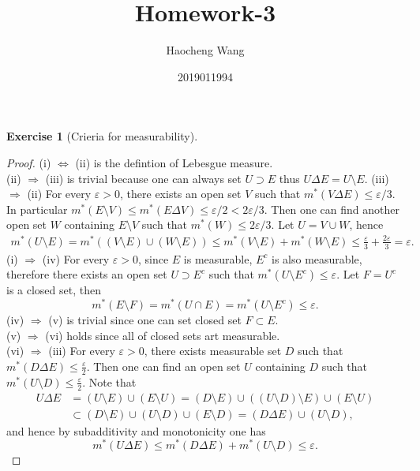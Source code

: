 \documentclass[a4paper]{article}
\title{Homework-3}
\author{Haocheng Wang \and 2019011994}
\newtheorem{ex}{Exercise}[subsection]
\begin{document}
\maketitle
\setcounter{subsection}{2}
\setcounter{ex}{6}

\begin{ex}[Crieria for measurability]\end{ex}
\begin{proof}
(i) $\iff$ (ii) is the defintion of Lebesgue measure.\\
(ii) $\Rightarrow$ (iii) is trivial because one can always set $U \supset E$ thus $U \Delta E = U \setminus E$.
(iii) $\Rightarrow$ (ii) For every $\varepsilon > 0$, there exists an open set $V$ such that 
$m^*(V \Delta E) \leq \varepsilon/3$. In particular $m^*(E \setminus V) \leq m^*(E \Delta V) \leq 
\varepsilon/2 < 2\varepsilon /3$. Then one can find another open set $W$ containing $E \setminus V$ such that
$m^*(W) \leq 2\varepsilon / 3$. Let $U = V \cup W$, hence\begin{align*}
m^*(U \setminus E) = m^*((V \setminus E) \cup (W \setminus E)) \leq m^*(V \setminus E) + m^*(W \setminus E)
\leq \frac{\varepsilon}{3} + \frac{2\varepsilon}{3} = \varepsilon.
\end{align*}
(i) $\Rightarrow$ (iv) For every $\varepsilon > 0$, since $E$ is measurable, $E^c$ is also measurable, therefore
there exists an open set $U \supset E^c$ such that $m^*(U \setminus E^c) \leq \varepsilon$. Let $F = U^c$ is a 
closed set, then$$
m^*(E \setminus F) = m^*(U \cap E) = m^*(U \setminus E^c) \leq \varepsilon.
$$
(iv) $\Rightarrow$ (v) is trivial since one can set closed set $F \subset E$.\\
(v) $\Rightarrow$ (vi) holds since all of closed sets art measurable.\\
(vi) $\Rightarrow$ (iii) For every $\varepsilon > 0$, there exists measurable set $D$ such that 
$m^*(D \Delta E) \leq \frac{\varepsilon}{2}$. Then one can find an open set $U$ containing $D$ such that
$m^*(U \setminus D) \leq \frac{\varepsilon}{2}$. Note that\begin{align*}
U\Delta E &= (U \setminus E) \cup (E \setminus U) = (D\setminus E) \cup ((U \setminus D) \setminus E) \cup (E \setminus U)\\
&\subset (D \setminus E) \cup (U \setminus D) \cup (E \setminus D) = (D\Delta E) \cup (U \setminus D),
\end{align*}
and hence by subadditivity and monotonicity one has $$
m^*(U \Delta E) \leq m^*(D \Delta E) + m^*(U \setminus D) \leq \varepsilon.
$$
\end{proof}
\end{document}
